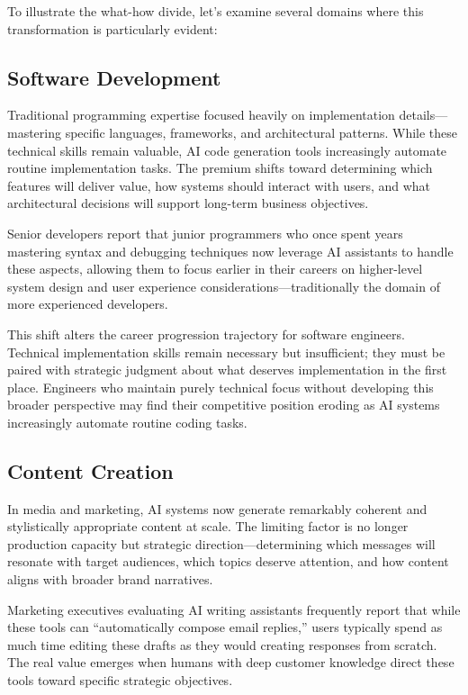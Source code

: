 \documentclass[
  Letterpaper,
]{scrbook}
\begin{document}
To illustrate the what-how divide, let's examine several domains where
this transformation is particularly evident:

\subsection{Software Development}\label{software-development}

Traditional programming expertise focused heavily on implementation
details---mastering specific languages, frameworks, and architectural
patterns. While these technical skills remain valuable, AI code
generation tools increasingly automate routine implementation tasks. The
premium shifts toward determining which features will deliver value, how
systems should interact with users, and what architectural decisions
will support long-term business objectives.

Senior developers report that junior programmers who once spent years
mastering syntax and debugging techniques now leverage AI assistants to
handle these aspects, allowing them to focus earlier in their careers on
higher-level system design and user experience
considerations---traditionally the domain of more experienced
developers.

This shift alters the career progression trajectory for software
engineers. Technical implementation skills remain necessary but
insufficient; they must be paired with strategic judgment about what
deserves implementation in the first place. Engineers who maintain
purely technical focus without developing this broader perspective may
find their competitive position eroding as AI systems increasingly
automate routine coding tasks.

\subsection{Content Creation}\label{content-creation}

In media and marketing, AI systems now generate remarkably coherent and
stylistically appropriate content at scale. The limiting factor is no
longer production capacity but strategic direction---determining which
messages will resonate with target audiences, which topics deserve
attention, and how content aligns with broader brand narratives.

Marketing executives evaluating AI writing assistants frequently report
that while these tools can ``automatically compose email replies,''
users typically spend as much time editing these drafts as they would
creating responses from scratch. The real value emerges when humans with
deep customer knowledge direct these tools toward specific strategic
objectives.
\end{document}
